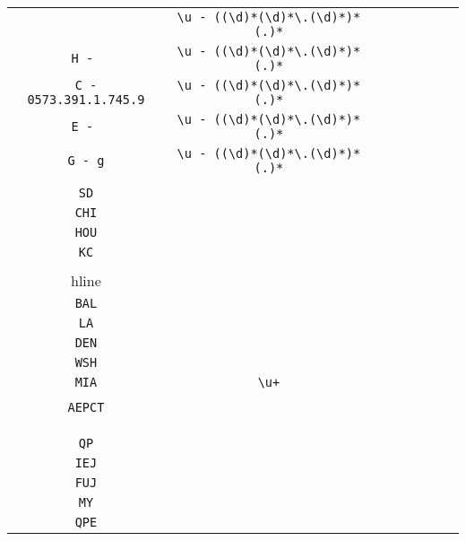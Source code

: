 \begin{longtable}{cccccccc}
\begin{tabular}{ll}
    \verb|O - | & \verb|\u - ((\d)*(\d)*\.(\d)*)*(.)*|\\
\verb|H - | & \verb|\u - ((\d)*(\d)*\.(\d)*)*(.)*|\\
\verb|C - 0573.391.1.745.9| & \verb|\u - ((\d)*(\d)*\.(\d)*)*(.)*|\\
\verb|E - | & \verb|\u - ((\d)*(\d)*\.(\d)*)*(.)*|\\
\verb|G - g| & \verb|\u - ((\d)*(\d)*\.(\d)*)*(.)*|
\end{tabular}
\\\midrule 
\begin{tabular}{l}
    \verb|SF|\\
\verb|SD|\\
\verb|CHI|\\
\verb|HOU|\\
\verb|KC|\\
\\hline\\
\verb|BAL|\\
\verb|LA|\\
\verb|DEN|\\
\verb|WSH|\\
\verb|MIA|
\end{tabular}

&
\verb|\u+|
&

\begin{tabular}{l}
    \verb|(\u)*|\\
\verb||\\
\verb|AEPCT|\\
\verb||\\
\verb||\\
\verb||
\end{tabular}

&

\begin{tabular}{l}
    \verb.(\u\u)|(\u\u\u).\\
\verb|QP|\\
\verb|IEJ|\\
\verb|FUJ|\\
\verb|MY|\\
\verb|QPE|
\end{tabular}

&


\end{longtable}
